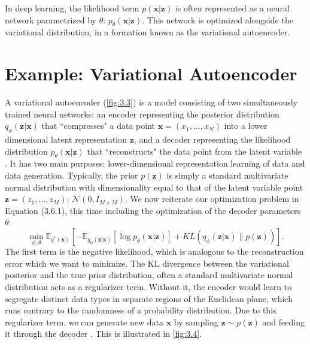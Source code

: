 \documentclass[honours,12pt]{unswthesis}
\newcommand{\E}{\mathbb{E}}
\numberwithin{equation}{section}
\theoremstyle{definition}
\begin{document}
In deep learning, the likelihood term $p(\bm{x}|\bm{z})$ is often represented as a neural network parametrized by $\theta$: $p_\theta(\bm{x}|\bm{z})$. This network is optimized alongside the variational distribution, in a formation known as the variational autoencoder.
\section{Example: Variational Autoencoder}\label{sec:3.7}
A variational autoencoder (\autoref{fig:3.3}) is a model consisting of two simultaneously trained neural networks: an encoder representing the posterior distribution $q_\phi(\bm{z}|\bm{x})$ that ``compresses" a data point $\bm{x}=(x_1,\dots,x_N)$ into a lower dimensional latent representation $\bm{z}$, and a decoder representing the likelihood distribution $p_\theta(\bm{x}|\bm{z})$ that ``reconstructs" the data point from the latent variable \citep{kingma}. It has two main purposes: lower-dimensional representation learning of data and data generation. Typically, the prior $p(\bm{z})$ is simply a standard multivariate normal distribution with dimensionality equal to that of the latent variable point \\$\bm{z}=(z_1,\dots,z_M)$: $\mathcal{N}(0,I_{M\times M})$. We now reiterate our optimization problem in Equation (3.6.1), this time including the optimization of the decoder parameters $\theta$:
\begin{equation}
\min_{\phi,\theta} \mathbb{E}_{q^*(\bm{x})}\left[-\E_{q_\phi(\bm{z}|\bm{x})}[\log p_\theta(\bm{x}|\bm{z})]+KL(q_\phi(\bm{z}|\bm{x})\|p(\bm{z}))\right].
\end{equation}
The first term is the negative likelihood, which is analogous to the reconstruction error which we want to minimize. The KL divergence between the variational posterior and the true prior distribution, often a standard multivariate normal distribution acts as a regularizer term. Without it, the encoder would learn to segregate distinct data types in separate regions of the Euclidean plane, which runs contrary to the randomness of a probability distribution. Due to this regularizer term, we can generate new data $\bm{x}$ by sampling $\bm{z}\sim p(\bm{z})$ and feeding it through the decoder \citep{vae}. This is illustrated in \autoref{fig:3.4}.
\end{document}
